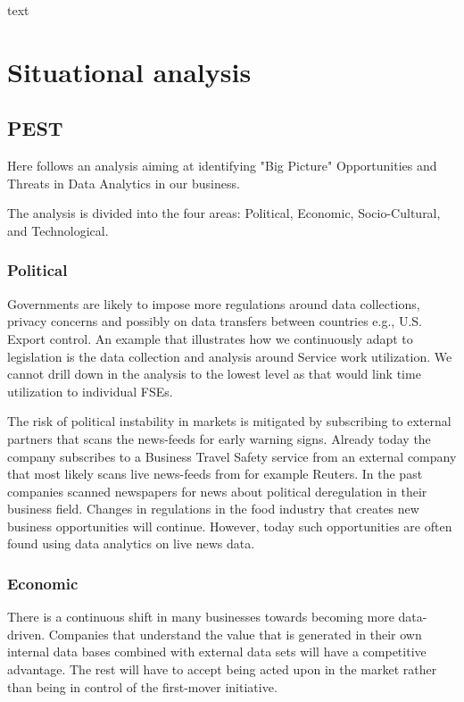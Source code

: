 \documentclass[10pt]{article} %
\begin{document}
text

\section{Situational analysis}
\subsection{PEST}
Here follows an analysis aiming at identifying "Big Picture" Opportunities and Threats in Data Analytics in our business. 

The analysis is divided into the four areas: Political, Economic, Socio-Cultural, and Technological.

\subsubsection{Political}
Governments are likely to impose more regulations around data collections, privacy concerns and possibly on data transfers between countries e.g., U.S. Export control.
An example that illustrates how we continuously adapt to legislation is the data collection and analysis around Service work utilization. We cannot drill down in the analysis to the lowest level as that would link time utilization to individual FSEs.

The risk of political instability in markets is mitigated by subscribing to external partners that scans the news-feeds for early warning signs. Already today the company subscribes to a Business Travel Safety service from an external company that most likely scans live news-feeds from for example Reuters. In the past companies scanned newspapers for news about political deregulation in their business field. Changes in regulations in the food industry that creates new business opportunities will continue. However, today such opportunities are often found using data analytics on live news data.

\subsubsection{Economic}
There is a continuous shift in many businesses towards becoming more data-driven. Companies that understand the value that is generated in their own internal data bases combined with external data sets will have a competitive advantage. The rest will have to accept being acted upon in the market rather than being in control of the first-mover initiative.
\end{document}
